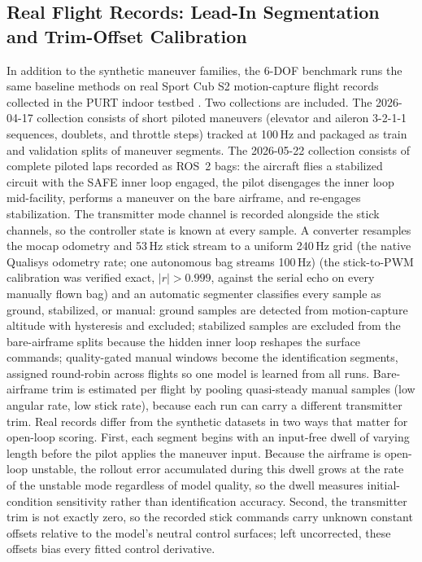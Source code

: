 \documentclass[11pt]{article}
\begin{document}
\subsection{Real Flight Records: Lead-In Segmentation and Trim-Offset Calibration}
\label{subsec:real_segmentation}

In addition to the synthetic maneuver families, the 6-DOF benchmark runs the
same baseline methods on real Sport Cub S2 motion-capture flight records
collected in the PURT indoor testbed \citep{sribunma2026indoor}. Two
collections are included. The 2026-04-17 collection consists of short piloted
maneuvers (elevator and aileron 3-2-1-1 sequences, doublets, and throttle
steps) tracked at 100\,Hz and packaged as train and validation splits of
maneuver segments. The 2026-05-22 collection consists of complete piloted
laps recorded as ROS~2 bags: the aircraft flies a stabilized circuit with the
SAFE inner loop engaged, the pilot disengages the inner loop mid-facility,
performs a maneuver on the bare airframe, and re-engages stabilization. The
transmitter mode channel is recorded alongside the stick channels, so the
controller state is known at every sample. A converter resamples the mocap
odometry and 53\,Hz stick stream to a uniform 240\,Hz grid (the native
Qualisys odometry rate; one autonomous bag streams 100\,Hz) (the stick-to-PWM
calibration was verified exact, $|r|>0.999$, against the serial echo on every
manually flown bag) and an automatic segmenter classifies every sample as
ground, stabilized, or manual: ground samples are detected from motion-capture
altitude with hysteresis and excluded; stabilized samples are excluded from the
bare-airframe splits because the hidden inner loop reshapes the surface
commands; quality-gated manual windows become the identification segments,
assigned round-robin across flights so one model is learned from all runs.
Bare-airframe trim is estimated per flight by pooling quasi-steady manual
samples (low angular rate, low stick rate), because each run can carry a
different transmitter trim. Real records differ from the synthetic datasets
in two ways that matter for open-loop scoring. First, each segment begins with
an input-free dwell of varying length before the pilot applies the maneuver
input. Because the airframe is open-loop unstable, the rollout error
accumulated during this dwell grows at the rate of the unstable mode
regardless of model quality, so the dwell measures initial-condition
sensitivity rather than identification accuracy. Second, the transmitter trim
is not exactly zero, so the recorded stick commands carry unknown constant
offsets relative to the model's neutral control surfaces; left uncorrected,
these offsets bias every fitted control derivative.
\end{document}
